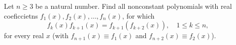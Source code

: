 Let $ n\ge 3$ be a natural number. Find all nonconstant polynomials with real coeficcietns $ f_{1}\left(x\right),f_{2}\left(x\right),\ldots,f_{n}\left(x\right)$, for which
\[ f_{k}\left(x\right)f_{k+ 1}\left(x\right) = f_{k +1}\left(f_{k + 2}\left(x\right)\right), \quad  1\le k\le n,\]
for every real $ x$ (with $ f_{n +1}\left(x\right)\equiv f_{1}\left(x\right)$ and $ f_{n + 2}\left(x\right)\equiv f_{2}\left(x\right)$).